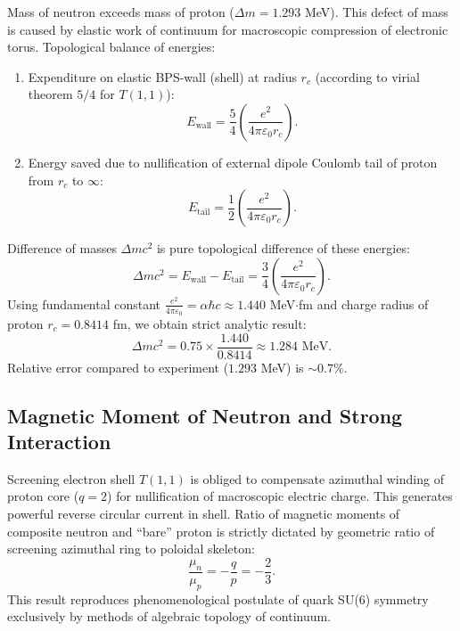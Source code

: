 \documentclass[12pt,a4paper]{article}
\begin{document}
Mass of neutron exceeds mass of proton ($\Delta m = 1.293$ MeV). This defect of mass is caused by elastic work of continuum for macroscopic compression of electronic torus. Topological balance of energies:
\begin{enumerate}
    \item Expenditure on elastic BPS-wall (shell) at radius $r_c$ (according to virial theorem $5/4$ for $T(1,1)$):
    $$ E_{\text{wall}} = \frac{5}{4} \left( \frac{e^2}{4\pi\varepsilon_0 r_c} \right). $$
    \item Energy saved due to nullification of external dipole Coulomb tail of proton from $r_c$ to $\infty$:
    $$ E_{\text{tail}} = \frac{1}{2} \left( \frac{e^2}{4\pi\varepsilon_0 r_c} \right). $$
\end{enumerate}
Difference of masses $\Delta m c^2$ is pure topological difference of these energies:
\begin{equation}
    \Delta m c^2 = E_{\text{wall}} - E_{\text{tail}} = \frac{3}{4} \left( \frac{e^2}{4\pi\varepsilon_0 r_c} \right).
    \label{eq:neutron_mass_diff}
\end{equation}
Using fundamental constant $\frac{e^2}{4\pi\varepsilon_0} = \alpha\hbar c \approx 1.440$ MeV$\cdot$fm and charge radius of proton $r_c = 0.8414$ fm, we obtain strict analytic result:
\begin{equation}
    \Delta m c^2 = 0.75 \times \frac{1.440}{0.8414} \approx 1.284 \text{ MeV}.
    \label{eq:neutron_mass_result}
\end{equation}
Relative error compared to experiment ($1.293$ MeV) is $\sim 0.7\%$.

\subsection{Magnetic Moment of Neutron and Strong Interaction}
Screening electron shell $T(1,1)$ is obliged to compensate azimuthal winding of proton core ($q=2$) for nullification of macroscopic electric charge. This generates powerful reverse circular current in shell. Ratio of magnetic moments of composite neutron and ``bare'' proton is strictly dictated by geometric ratio of screening azimuthal ring to poloidal skeleton:
\begin{equation}
    \frac{\mu_n}{\mu_p} = -\frac{q}{p} = -\frac{2}{3}.
    \label{eq:magnetic_moment_neutron}
\end{equation}
This result reproduces phenomenological postulate of quark SU(6) symmetry exclusively by methods of algebraic topology of continuum.
\end{document}
